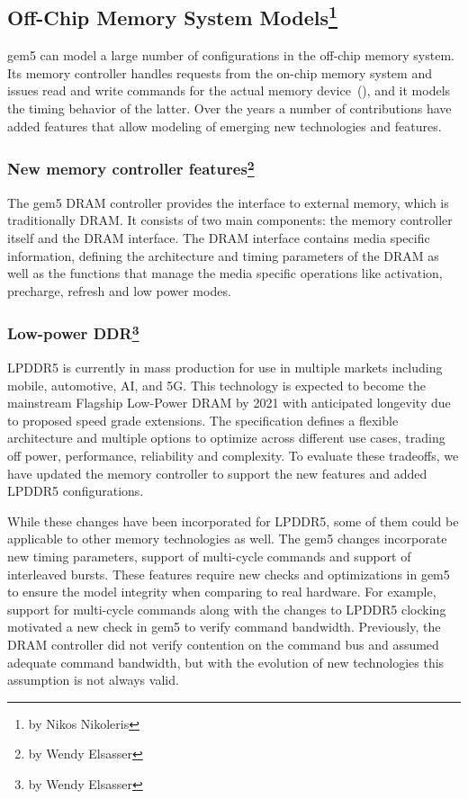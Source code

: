 \subsection[Off-Chip Memory System Models]{Off-Chip Memory System Models\footnote{by Nikos Nikoleris}}

gem5 can model a large number of configurations in the off-chip memory system.
Its memory controller handles requests from the on-chip memory system and issues read and write commands for the actual memory device~\cite{}(), and it models the timing behavior of the latter.
Over the years a number of contributions have added features that allow modeling of emerging new technologies and features.

\subsubsection[New memory controller features]{New memory controller features\footnote{by Wendy Elsasser}}

The gem5 DRAM controller provides the interface to external memory, which is traditionally DRAM.
It consists of two main components: the memory controller itself and the DRAM interface.
The DRAM interface contains media specific information, defining the architecture and timing parameters of the DRAM as well as the functions that manage the media specific operations like activation, precharge, refresh and low power modes.

\subsubsection[Low-power DDR]{Low-power DDR\footnote{by Wendy Elsasser}}

LPDDR5 is currently in mass production for use in multiple markets including mobile, automotive, AI, and 5G.
This technology is expected to become the mainstream Flagship Low-Power DRAM by 2021 with anticipated longevity due to proposed speed grade extensions.
The specification defines a flexible architecture and multiple options to optimize across different use cases, trading off power, performance, reliability and complexity.
To evaluate these tradeoffs, we have updated the memory controller to support the new features and added LPDDR5 configurations.

While these changes have been incorporated for LPDDR5, some of them could be applicable to other memory technologies as well.
The gem5 changes incorporate new timing parameters, support of multi-cycle commands and support of interleaved bursts.
These features require new checks and optimizations in gem5 to ensure the model integrity when comparing to real hardware.
For example, support for multi-cycle commands along with the changes to LPDDR5 clocking motivated a new check in gem5 to verify command bandwidth.
Previously, the DRAM controller did not verify contention on the command bus and assumed adequate command bandwidth, but with the evolution of new technologies this assumption is not always valid.

